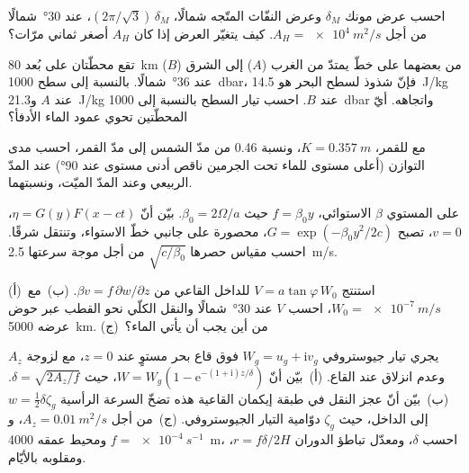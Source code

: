 \begin{exercise}[$\star\star$]\label{exo:b3:ocean-dynamics:7}
احسب عرض مونك $\delta_M$ وعرض النفّاث المتّجه شمالًا،
$(2\pi/\sqrt3)\,\delta_M$، عند \ang{30}~شمالًا من أجل $A_H = \qty{e4}{m^2/s}$. كيف
يتغيّر العرض إذا كان $A_H$ أصغر ثماني مرّات؟
\end{exercise}

\begin{exercise}[$\star\star$]\label{exo:b3:ocean-dynamics:8}
تقع محطّتان على بُعد \qty{80}{km} من بعضهما على خطّ يمتدّ من الغرب ($A$) إلى
الشرق ($B$) عند \ang{36}~شمالًا. بالنسبة إلى سطح \qty{1000}{dbar}، فإنّ
شذوذ  لسطح البحر هو \qty{14.5}{J/kg} عند $A$
و\qty{21.3}{J/kg} عند $B$. احسب تيار السطح بالنسبة إلى
\qty{1000}{dbar} واتجاهه. أيّ المحطّتين تحوي
عمود الماء الأدفأ؟
\end{exercise}

\begin{exercise}[$\star\star$]\label{exo:b3:ocean-dynamics:9}
مع  للقمر، $K = \qty{0.357}{m}$، ونسبة
\num{0.46} من مدّ الشمس إلى مدّ القمر، احسب مدى التوازن
(أعلى مستوى للماء تحت الجرمين ناقص أدنى مستوى عند \ang{90}) عند المدّ الربيعي وعند
المدّ الميّت، ونسبتهما.
\end{exercise}

\begin{exercise}[$\star\star\star$]\label{exo:b3:ocean-dynamics:10}
على المستوي $\beta$ الاستوائي، $f = \beta_0y$ حيث $\beta_0 =
2\Omega/a$. بيّن أنّ  $\eta = G(y)F(x - ct)$، $v = 0$،
تصبح $G = \exp(-\beta_0y^2/2c)$، محصورة على جانبي خطّ الاستواء،
وتنتقل شرقًا. احسب مقياس حصرها $\sqrt{c/\beta_0}$ من أجل
موجة سرعتها \qty{2.5}{m/s}.
\end{exercise}

\begin{exercise}[$\star\star\star$]\label{exo:b3:ocean-dynamics:11}
(أ)~استنتج $V = a\tan\varphi\,W_0$ للداخل القاعي من $\beta v =
f\,\partial w/\partial z$. (ب)~مع $W_0 = \qty{e-7}{m/s}$، احسب $V$ عند
\ang{30}~شمالًا والنقل الكلّي نحو القطب عبر حوض
عرضه \qty{5000}{km}. (ج)~من أين يجب أن يأتي الماء؟
\end{exercise}

\begin{exercise}[$\star\star\star$]\label{exo:b3:ocean-dynamics:12}
يجري تيار جيوستروفي $W_g = u_g + \mathrm iv_g$ فوق قاع بحر مستوٍ
عند $z = 0$، مع لزوجة  $A_z$ وعدم انزلاق عند القاع.
(أ)~بيّن أنّ $W = W_g(1 - \mathrm e^{-(1+\mathrm i)z/\delta})$، حيث $\delta =
\sqrt{2A_z/f}$. (ب)~بيّن أنّ عجز النقل في طبقة إيكمان القاعية هذه
تضخّ السرعة الرأسية $w = \tfrac12\delta\zeta_g$ إلى
الداخل، حيث $\zeta_g$ دوّامية التيار الجيوستروفي. (ج)~من أجل
$A_z = \qty{0.01}{m^2/s}$، و$f = \qty{e-4}{s^{-1}}$ ومحيط
عمقه \qty{4000}{m}، احسب $\delta$، ومعدّل تباطؤ الدوران $r =
f\delta/2H$، ومقلوبه بالأيّام.
\end{exercise}

